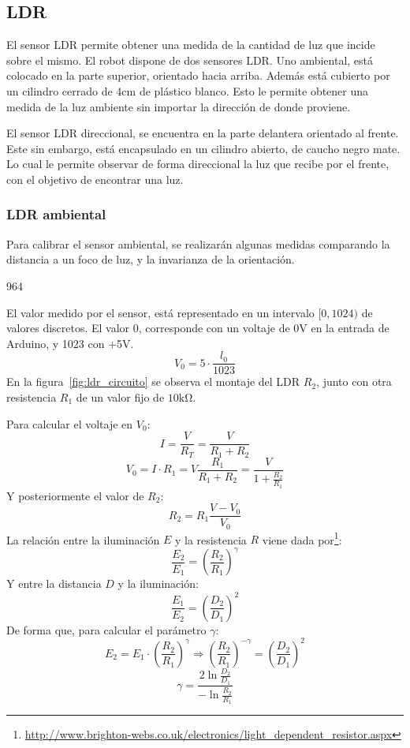 \documentclass[10pt,a4paper,hidelinks]{article}
\begin{document}
\begin{multicols}{2}
\subsection{LDR}

El sensor LDR permite obtener una medida de la cantidad de luz que incide sobre
el mismo. El robot dispone de dos sensores LDR. Uno ambiental, está colocado en
la parte superior, orientado hacia arriba. Además está cubierto por un cilindro
cerrado de 4cm de plástico blanco. Esto le permite obtener una medida de la luz
ambiente sin importar la dirección de donde proviene.

El sensor LDR direccional, se encuentra en la parte delantera orientado al 
frente. Este sin embargo, está encapsulado en un cilindro abierto, de caucho 
negro mate. Lo cual le permite observar de forma direccional la luz que recibe 
por el frente, con el objetivo de encontrar una luz.

\subsubsection{LDR ambiental}

Para calibrar el sensor ambiental, se realizarán algunas medidas comparando la 
distancia a un foco de luz, y la invarianza de la orientación.

964

El valor medido por el sensor, está representado en un intervalo $[0, 1024)$ de 
valores discretos. El valor 0, corresponde con un voltaje de 0V en la entrada de 
Arduino, y 1023 con +5V.
$$ V_0 = 5 \cdot \frac{l_0}{1023} $$
En la figura~\ref{fig:ldr_circuito} se observa el montaje del LDR $R_2$, junto 
con otra resistencia $R_1$ de un valor fijo de $10\si{\kohm}$.

\begin{center}
\end{center}

Para calcular el voltaje en $V_0$:
$$ I = \frac{V}{R_T} = \frac{V}{R_1 + R_2} $$
$$ V_{0} = I \cdot R_1 = V \frac{R_1}{R_1+R_2} = \frac{V}{1+\frac{R_2}{R_1}}$$
Y posteriormente el valor de $R_2$:
$$ R_{2} = R_1 \frac{V-V_0}{V_0}$$
La relación entre la iluminación $E$ y la resistencia $R$ viene dada 
por\footnote{\url{http://www.brighton-webs.co.uk/electronics/light\_dependent\_resistor.aspx}}:
$$ \frac{E_2}{E_1} = \left(\frac{R_2}{R_1}\right)^\gamma$$
Y entre la distancia $D$ y la iluminación:
$$ \frac{E_1}{E_2} = \left(\frac{D_2}{D_1}\right)^2$$
De forma que, para calcular el parámetro $\gamma$:
$$ E_2 = E_1 \cdot \left( \frac{R_2}{R_1} \right) ^\gamma \Rightarrow 
\left(\frac{R_2}{R_1} \right)^{-\gamma} = \left(\frac{D_2}{D_1}\right)^2$$
$$ \gamma = \frac{2 \ln \frac{D_2}{D_1} }{-\ln\frac{R_2}{R_1}} $$


\end{multicols}
\end{document}
